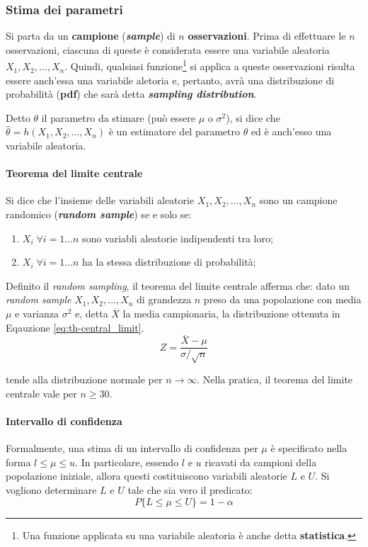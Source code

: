 \documentclass{article}
\begin{document}
\subsubsection{Stima dei parametri}
Si parta da un \textbf{campione} (\textbf{\textit{sample}}) di $n$ \textbf{osservazioni}. 
Prima di effettuare le $n$ osservazioni, ciascuna di queste è considerata essere una 
variabile aleatoria $X_1, X_2, \dots, X_n$. Quindi, qualsiasi funzione\footnote{Una funzione
applicata su una variabile aleatoria è anche detta \textbf{statistica}.} si applica a queste
osservazioni risulta essere anch'essa una variabile aletoria e, pertanto, avrà una 
distribuzione di probabilità (\textbf{pdf}) che sarà detta \textbf{\textit{sampling
distribution}}. 

Detto $\theta$ il parametro da stimare (può essere $\mu$ o $\sigma^2$), si dice che $\hat{
  \theta} = h(X_1, X_2, \dots, X_n)$ è un estimatore del parametro $\theta$ ed è anch'esso
una variabile aleatoria.

\paragraph{Teorema del limite centrale}
Si dice che l'insieme delle variabili aleatorie $X_1, X_2, \dots, X_n$ sono un campione 
randomico (\textbf{\textit{random sample}}) se e solo se:

\begin{enumerate}[label=(\alph*)]
  \item $X_i\;\forall i = 1\dots n$ sono variabli aleatorie indipendenti tra loro;
  \item $X_i\;\forall i = 1\dots n$ ha la stessa distribuzione di probabilità;
\end{enumerate}

Definito il \textit{random sampling}, il teorema del limite centrale afferma che: 
dato un \textit{random sample} $X_1, X_2, \dots, X_n$ di grandezza $n$ preso da una 
popolazione con media $\mu$ e varianza $\sigma^2$ e,  detta $\overline{X}$ la media 
campionaria, la distribuzione ottenuta in Eqauzione \ref{eq:th-central_limit}.
\begin{equation}
  Z = \displaystyle\frac{\overline{X} - \mu}{\sigma/\sqrt{n}}
  \label{eq:th-central_limit}
\end{equation}

tende alla distribuzione normale per $n\rightarrow \infty$. Nella pratica, il teorema del 
limite centrale vale per $n \geq 30$.
\paragraph{Intervallo di confidenza}
Formalmente, una stima di un intervallo di confidenza per $\mu$ è specificato nella forma 
$l \leq \mu \leq u$. In particolare, essendo $l$ e $u$ ricavati da campioni della popolazione
iniziale, allora questi costituiscono variabili aleatorie $L$ e $U$. Si vogliono determinare
$L$ e $U$ tale che sia vero il predicato:
$$ P\{L\leq \mu \leq U\} = 1 - \alpha $$
\end{document}
